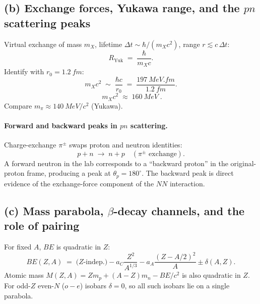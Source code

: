 \documentclass[11pt]{article}
\begin{document}
\subsection*{(b) Exchange forces, Yukawa range, and the $pn$ scattering peaks}

Virtual exchange of mass $m_{X}$, lifetime $\Delta t\sim\hbar/(m_{X}c^{2})$, range $r\lesssim c\,\Delta t$:
\begin{equation}
R_\text{Yuk}\;=\;\frac{\hbar}{m_{X}c}.
\label{eq:Yukawa-range}
\end{equation}
Identify with $r_{0}=\SI{1.2}{fm}$:
\[
m_{X}c^{2}\;\sim\;\frac{\hbar c}{r_{0}}\;=\;\frac{\SI{197}{MeV.fm}}{\SI{1.2}{fm}}.
\]
\begin{equation}
\boxed{\;m_{X}c^{2}\;\approx\;\SI{160}{MeV}\;.}
\label{eq:mX}
\end{equation}
Compare $m_{\pi}\approx\SI{140}{MeV/c^{2}}$ (Yukawa).

\paragraph{Forward and backward peaks in $pn$ scattering.} Charge-exchange $\pi^{\pm}$ swaps proton and neutron identities:
\[
p+n\;\to\;n+p\quad(\pi^{\pm}\text{ exchange}).
\]
A forward neutron in the lab corresponds to a ``backward proton'' in the original-proton frame, producing a peak at $\theta_{p}=180^{\circ}$. The backward peak is direct evidence of the exchange-force component of the $NN$ interaction.

\subsection*{(c) Mass parabola, $\beta$-decay channels, and the role of pairing}

For fixed $A$, $BE$ is quadratic in $Z$:
\begin{equation}
BE(Z,A)\;=\;\text{($Z$-indep.)}-a_{C}\frac{Z^{2}}{A^{1/3}}-a_{A}\frac{(Z-A/2)^{2}}{A}\pm\delta(A,Z).
\label{eq:semf-Zfix}
\end{equation}
Atomic mass $M(Z,A)=Zm_{p}+(A-Z)m_{n}-BE/c^{2}$ is also quadratic in $Z$. For odd-$Z$ even-$N$ ($o\!-\!e$) isobars $\delta=0$, so all such isobars lie on a single parabola.
\end{document}

